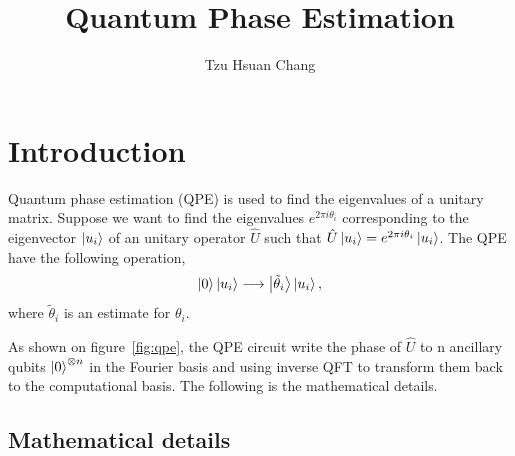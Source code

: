 \documentclass[a4paper]{article}
\title{Quantum Phase Estimation}
\author{Tzu Hsuan Chang}
\begin{document}
\maketitle

\section{Introduction}
\label{sec:Intro}
Quantum phase estimation (QPE) is used to find the eigenvalues of a unitary matrix. Suppose we want to find the eigenvalues $e^{2 \pi i \theta_i}$ corresponding to the eigenvector $\ket {u_i}$ of an unitary operator $\hat{U}$ such that
$\hat{U} \ket{u_i}  = e^{2 \pi i \theta_i} \ket{u_i}$. The QPE have the following operation,
    \begin{equation} \label{eq:eq1}
    \setlength{\jot}{10pt}
        \ket{0} \ket{u_i}   \longrightarrow   \ket{\tilde \theta_i} \ket{u_i},
    \end{equation}
where $\tilde \theta_i$ is an estimate for $\theta_i$.

As shown on figure~\ref{fig:qpe}, the QPE circuit write the phase of $\hat U$ to n ancillary qubits $\ket{0}^{\otimes n}$ in the Fourier basis and using inverse QFT to transform them back to the computational basis. The following is the mathematical details.

\subsection*{Mathematical details}
\label {subsec:qpe}
\end{document}
